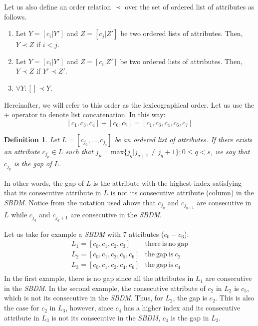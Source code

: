 \documentclass[number,preprint,review,12pt]{elsarticle}
\newtheorem{definition}{Definition}
\begin{document}
	Let us also define an order relation $\prec$ over the set of ordered list of attributes as follows.
	\begin{enumerate}
		\item Let $Y=[c_i|Y']$ and $Z=[c_j|Z']$ be two ordered lists of attributes. Then, $Y \prec Z$ if $i<j$.
		\item Let $Y=[c_i|Y']$ and $Z=[c_i|Z']$ be two ordered lists of attributes. Then, $Y \prec Z$ if $Y' \prec Z'$.
		\item $\forall Y:  [] \prec Y$.
	\end{enumerate}
	Hereinafter, we will refer to this order as the lexicographical order. Let us use the $+$ operator to denote list concatenation. In this way: $$[c_1,c_3,c_4]+[c_6,c_7]=[c_1,c_3,c_4,c_6,c_7]$$
		
	
	\begin{definition}\label{def:gap}
		Let $L = [c_{j_0},...,c_{j_s}]$ be an ordered list of attributes. If there exists an attribute $c_{j_p} \in L$ such that ${j_p}=\mathrm{max}\{j_q | j_{q+1} \neq j_q+1\}; 0 \leq q < s$, we say that $c_{j_p}$ is the gap of $L$.
	\end{definition}
	
	In other words, the gap of $L$ is the attribute with the highest index satisfying that its consecutive attribute in $L$ is not its consecutive attribute (column) in the \textit{SBDM}. Notice from the notation used above that $c_{j_q}$ and $c_{j_{q+1}}$ are consecutive in $L$ while $c_{j_q}$ and $c_{j_q+1}$ are consecutive in the \textit{SBDM}.
	
	Let us take for example a \textit{SBDM} with 7 attributes ($c_0 - c_6$):
	$$\begin{array}{ll}
	{L_1=[c_0,c_1,c_2,c_3]} 		& \mathrm{there~is~no~gap}\\
	{L_2=[c_0,c_1,c_2,c_5,c_6]} 	& \mathrm{the~gap~is~} c_2\\
	{L_3=[c_0,c_1,c_2,c_4,c_6]} 	& \mathrm{the~gap~is~} c_4\\
	\end{array}$$
	In the first example, there is no gap since all the attributes in $L_1$ are consecutive in the \textit{SBDM}. In the second example, the consecutive attribute of $c_2$ in $L_2$ is $c_5$, which is not its consecutive in the \textit{SBDM}. Thus, for $L_2$, the gap is $c_2$. This is also the case for $c_2$ in $L_3$, however, since $c_4$ has a higher index and its consecutive attribute in $L_3$ is not its consecutive in the \textit{SBDM}, $c_4$ is the gap in $L_3$.
\end{document}
